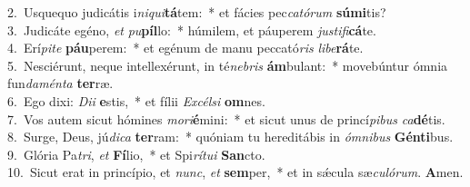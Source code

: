 {2.~}Usquequo judicátis i\textit{ni}\textit{qui}\textbf{tá}tem:~* et fácies pec\textit{ca}\textit{tó}\textit{rum} \textbf{sú}\textbf{mi}tis?\\
{3.~}Judicáte egéno, \textit{et} \textit{pu}\textbf{píl}lo:~* húmilem, et páuperem \textit{ju}\textit{sti}\textit{fi}\textbf{cá}te.\\
{4.~}Erí\textit{pi}\textit{te} \textbf{páu}perem:~* et egénum de manu peccató\textit{ris} \textit{li}\textit{be}\textbf{rá}te.\\
{5.~}Nesciérunt, neque intellexérunt, in té\textit{ne}\textit{bris} \textbf{ám}bulant:~* movebúntur ómnia fun\textit{da}\textit{mén}\textit{ta} \textbf{ter}ræ.\\
{6.~}Ego dixi: \textit{Di}\textit{i} \textbf{e}stis,~* et fílii \textit{Ex}\textit{cél}\textit{si} \textbf{om}nes.\\
{7.~}Vos autem sicut hómines \textit{mo}\textit{ri}\textbf{é}mini:~* et sicut unus de princí\textit{pi}\textit{bus} \textit{ca}\textbf{dé}tis.\\
{8.~}Surge, Deus, jú\textit{di}\textit{ca} \textbf{ter}ram:~* quóniam tu hereditábis in \textit{óm}\textit{ni}\textit{bus} \textbf{Gén}\textbf{ti}bus.\\
{9.~}Glória Pa\textit{tri}, \textit{et} \textbf{Fí}lio,~* et Spi\textit{rí}\textit{tu}\textit{i} \textbf{San}cto.\\
{10.~}Sicut erat in princípio, et \textit{nunc}, \textit{et} \textbf{sem}per,~* et in sǽcula sæ\textit{cu}\textit{ló}\textit{rum}. \textbf{A}men.\\
